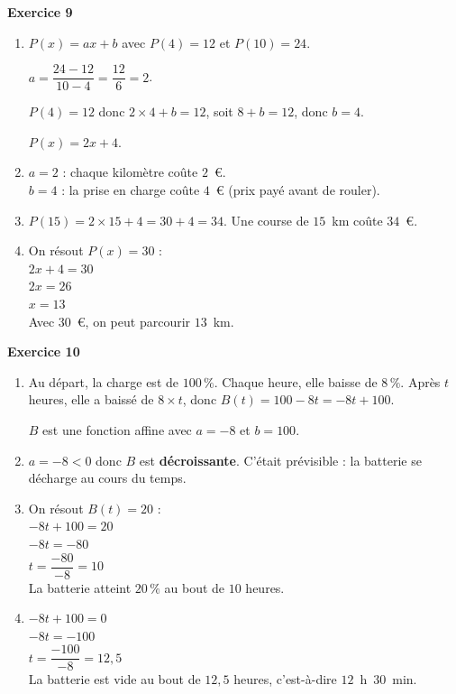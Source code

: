 \documentclass[a4paper,11pt]{article}
\newenvironment{exercice}[1]{%
  \Needspace{6\baselineskip}\par\bigskip\noindent\textbf{Exercice #1}\par\smallskip\noindent\ignorespaces
}{%
  \par
}
\begin{document}
\begin{exercice}{9}
\begin{enumerate}[label=\arabic*.]
\item $P(x)=ax+b$ avec $P(4)=12$ et $P(10)=24$.

$a=\dfrac{24-12}{10-4}=\dfrac{12}{6}=2$.

$P(4)=12$ donc $2\times 4+b=12$, soit $8+b=12$, donc $b=4$.

$P(x)=2x+4$.
\item $a=2$ : chaque kilomètre coûte $2$~€.\\
$b=4$ : la prise en charge coûte $4$~€ (prix payé avant de rouler).
\item $P(15)=2\times 15+4=30+4=34$. Une course de $15$~km coûte $34$~€.
\item On résout $P(x)=30$ :\\
$2x+4=30$\\
$2x=26$\\
$x=13$\\
Avec $30$~€, on peut parcourir $13$~km.
\end{enumerate}
\end{exercice}

\begin{exercice}{10}
\begin{enumerate}[label=\arabic*.]
\item Au départ, la charge est de $100\,\%$. Chaque heure, elle baisse de $8\,\%$. Après $t$ heures, elle a baissé de $8\times t$, donc $B(t)=100-8t=-8t+100$.

$B$ est une fonction affine avec $a=-8$ et $b=100$.
\item $a=-8<0$ donc $B$ est \textbf{décroissante}. C'était prévisible : la batterie se décharge au cours du temps.
\item On résout $B(t)=20$ :\\
$-8t+100=20$\\
$-8t=-80$\\
$t=\dfrac{-80}{-8}=10$\\
La batterie atteint $20\,\%$ au bout de $10$ heures.
\item $-8t+100=0$\\
$-8t=-100$\\
$t=\dfrac{-100}{-8}=12{,}5$\\
La batterie est vide au bout de $12{,}5$ heures, c'est-à-dire $12$~h~$30$~min.
\end{enumerate}
\end{exercice}
\end{document}

